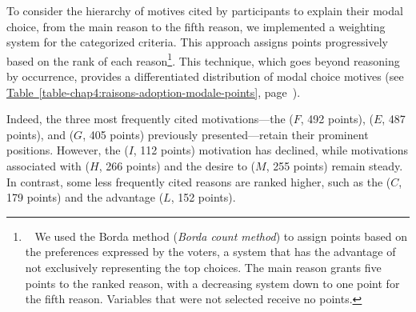\begin{refsegment}
To consider the hierarchy of motives cited by participants to explain their modal choice, from the main reason to the fifth reason, we implemented a weighting system for the categorized criteria. This approach assigns points progressively based on the rank of each reason\footnote{~
    We used the Borda method (\textsl{Borda count method}) to assign points based on the preferences expressed by the voters, a system that has the advantage of not exclusively representing the top choices. The main reason grants five points to the ranked reason, with a decreasing system down to one point for the fifth reason. Variables that were not selected receive no points.
}. This technique, which goes beyond reasoning by occurrence, provides a differentiated distribution of modal choice motives (see \hyperref[table-chap4:raisons-adoption-modale-points]{Table~\ref{table-chap4:raisons-adoption-modale-points}}, page~\pageref{table-chap4:raisons-adoption-modale-points}).%

Indeed, the three most frequently cited motivations—the  (\(F\), 492 points),  (\(E\), 487 points), and  (\(G\), 405 points) previously presented—retain their prominent positions. However, the  (\(I\), 112 points) motivation has declined, while motivations associated with  (\(H\), 266 points) and the desire to  (\(M\), 255 points) remain steady. In contrast, some less frequently cited reasons are ranked higher, such as the  (\(C\), 179 points) and the  advantage (\(L\), 152 points).%



\end{refsegment}
